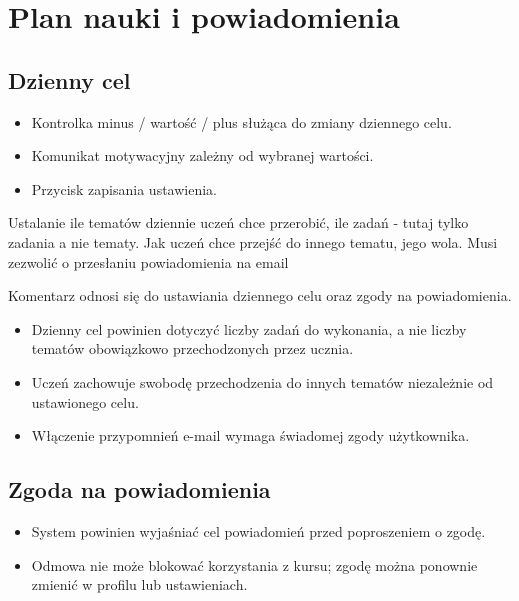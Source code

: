 \documentclass[12pt,a4paper]{report}
\begin{document}
\chapter{Plan nauki i powiadomienia}
\section{Dzienny cel}
\begin{ElearnObservedUI}
\begin{itemize}
  \item Kontrolka minus / wartość / plus służąca do zmiany dziennego celu.
  \item Komunikat motywacyjny zależny od wybranej wartości.
  \item Przycisk zapisania ustawienia.
\end{itemize}
\end{ElearnObservedUI}
\begin{ElearnReviewComment}[title={Komentarz nr 1 -- Anna Kogut, 2026-07-22}]
Ustalanie ile tematów dziennie uczeń chce przerobić, ile zadań - tutaj tylko zadania a nie tematy. Jak uczeń chce przejść do innego tematu, jego wola. Musi zezwolić o przesłaniu powiadomienia na email

Komentarz odnosi się do ustawiania dziennego celu oraz zgody na powiadomienia.
\end{ElearnReviewComment}
\begin{ElearnRequirement}[title={Wymagania wynikające z komentarza}]
\begin{itemize}
  \item Dzienny cel powinien dotyczyć liczby zadań do wykonania, a nie liczby tematów obowiązkowo przechodzonych przez ucznia.
  \item Uczeń zachowuje swobodę przechodzenia do innych tematów niezależnie od ustawionego celu.
  \item Włączenie przypomnień e-mail wymaga świadomej zgody użytkownika.
\end{itemize}
\end{ElearnRequirement}
\section{Zgoda na powiadomienia}
\begin{ElearnRequirement}[title={Uzupełniające wymagania UX}]
\begin{itemize}
  \item System powinien wyjaśniać cel powiadomień przed poproszeniem o zgodę.
  \item Odmowa nie może blokować korzystania z kursu; zgodę można ponownie zmienić w profilu lub ustawieniach.
\end{itemize}
\end{ElearnRequirement}
\end{document}
